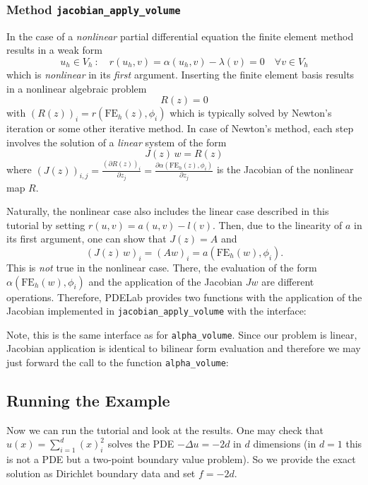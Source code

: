 \documentclass[a4paper,12pt]{article}
\begin{document}
\subsubsection*{Method \lstinline{jacobian_apply_volume}}

In the case of a {\em nonlinear} partial differential equation
the finite element method results in a weak form 
$$u_h \in V_h \ : \quad r(u_h,v) = \alpha(u_h,v) - \lambda(v) = 0 \quad \forall v\in V_h$$
which is {\em nonlinear} in its {\em first} argument. Inserting
the finite element basis results in a nonlinear algebraic problem
$$R(z) = 0$$
with $(R(z))_i = r(\text{FE}_h(z),\phi_i)$ which is typically solved by Newton's iteration
or some other iterative method. In case of Newton's method, each step
involves the solution of a {\em linear} system of the form
$$J(z)\, w = R(z)$$
where $(J(z))_{i,j} = \frac{(\partial R(z))_i}{\partial z_j} = 
\frac{\partial \alpha(\text{FE}_h(z),\phi_i)}{\partial z_j}$ is the Jacobian of 
the nonlinear map $R$.

Naturally, the nonlinear case also includes the linear case described in this tutorial
by setting $r(u,v) = a(u,v)-l(v)$. Then, due to the linearity of $a$ in its first
argument, one can show that $J(z) = A$ and 
$$(J(z)\, w)_i = (Aw)_i = a(\text{FE}_h(w),\phi_i).$$
This is {\em not} true in the nonlinear case. There, the evaluation 
of the form $\alpha(\text{FE}_h(w),\phi_i)$ and the application of the Jacobian $J w$
are different operations. Therefore, PDELab provides two functions with
the application of the Jacobian implemented in \lstinline{jacobian_apply_volume}
with the interface:

Note, this is the same interface as for \lstinline{alpha_volume}.
Since our problem is linear, Jacobian application is identical to bilinear form
evaluation and therefore we may just forward the call to the
function \lstinline{alpha_volume}:


\subsection{Running the Example}

Now we can run the tutorial and look at the results.
One may check that $u(x) = \sum_{i=1}^d (x)_i^2$
solves the PDE $-\Delta u = -2d$ in $d$ dimensions
(in $d=1$ this is not a PDE but a two-point boundary value problem).
So we provide the exact solution as Dirichlet boundary data and set $f=-2d$. 
\end{document}
